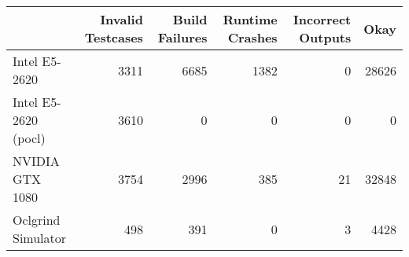 \begin{tabular}{lrrrrr}
\toprule
{} &  Invalid Testcases &  Build Failures &  Runtime Crashes &  Incorrect Outputs &   Okay \\
\midrule
Intel E5-2620        &               3311 &            6685 &             1382 &                  0 &  28626 \\
Intel E5-2620 (pocl) &               3610 &               0 &                0 &                  0 &      0 \\
NVIDIA GTX 1080      &               3754 &            2996 &              385 &                 21 &  32848 \\
Oclgrind Simulator   &                498 &             391 &                0 &                  3 &   4428 \\
\bottomrule
\end{tabular}
